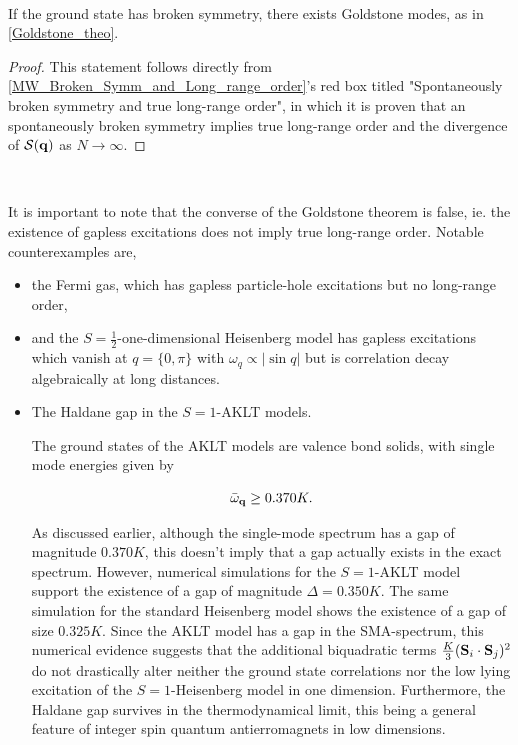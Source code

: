 \documentclass{homework}
\begin{document}
\blanky \\

\begin{corr}

If the ground state has broken symmetry, there exists Goldstone modes, as in \cref{Goldstone_theo}. 

\end{corr}

\begin{proof}

This statement follows directly from \cref{MW_Broken_Symm_and_Long_range_order}'s red box titled "Spontaneously broken symmetry and true long-range order", in which it is proven that an spontaneously broken symmetry implies true long-range order and the divergence of $\mathcal{S}({\bf q})$ as $N \rightarrow \infty$. 

\end{proof}

\blanky \\

\begin{tcolorbox}[colback = yellow, title = Physical Context]

It is important to note that the converse of the Goldstone theorem is false, ie. the existence of gapless excitations does not imply true long-range order. Notable counterexamples are,

\begin{itemize}
    \item the Fermi gas, which has gapless particle-hole excitations but no long-range order,
    \item and the $S= \frac{1}{2}$-one-dimensional Heisenberg model has gapless excitations which vanish at $q = \{0, \pi\}$ with ${\omega}_{q} \propto |\sin q|$ but is correlation decay algebraically at long distances. 
    \item The Haldane gap in the $S=1$-AKLT models. 
          
          The ground states of the AKLT models are valence bond solids, with single mode energies given by 
          
          $$
              \bar{\omega}_{\bf q} \geq 0.370K.
          $$
          
          As discussed earlier, although the single-mode spectrum has a gap of magnitude $0.370K$, this doesn't imply that a gap actually exists in the exact spectrum. However, numerical simulations for the $S=1$-AKLT model support the existence of a gap of magnitude $\Delta = 0.350K$. The same simulation for the standard Heisenberg model shows the existence of a gap of size $0.325K$. Since the AKLT model has a gap in the SMA-spectrum, this numerical evidence suggests that the additional biquadratic terms $\frac{K}{3} ({\bf S}_i \cdot {\bf S}_j)^2$ do not drastically alter neither the ground state correlations nor the low lying excitation of the $S=1$-Heisenberg model in one dimension. Furthermore, the Haldane gap survives in the thermodynamical limit, this being a general feature of integer spin quantum antierromagnets in low dimensions. 
\end{itemize}

\end{tcolorbox}
\end{document}
